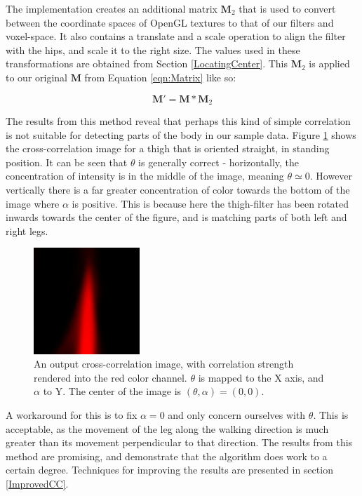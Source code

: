 The implementation creates an additional matrix $\mathbf{M}_2$ that is used to convert between the coordinate spaces of OpenGL textures to that of our filters and voxel-space.
It also contains a translate and a scale operation to align the filter with the hips, and scale it to the right size.
The values used in these transformations are obtained from Section \ref{LocatingCenter}.
This $\mathbf{M}_2$ is applied to our original $\mathbf{M}$ from Equation \ref{eqn:Matrix} like so:

\begin{equation}
	\mathbf{M}' = \mathbf{M} * \mathbf{M}_2
\end{equation}

\bigskip
\noindent The results from this method reveal that perhaps this kind of simple correlation is not suitable for detecting parts of the body in our sample data.
Figure \ref{ParameterSpace} shows the cross-correlation image for a thigh that is oriented straight, in standing position.
It can be seen that $\theta$ is generally correct - horizontally, the concentration of intensity is in the middle of the image, meaning $\theta \simeq 0$.
However vertically there is a far greater concentration of color towards the bottom of the image where $\alpha$ is positive.
This is because here the thigh-filter has been rotated inwards towards the center of the figure, and is matching parts of both left and right legs.

\begin{figure}[tb]
	\vspace{-10pt}
	\centering
	\includegraphics[height=4cm]{parameterspace.png}
	\caption{An output cross-correlation image, with correlation strength rendered into the red color channel.
		$\theta$ is mapped to the X axis, and $\alpha$ to Y.
		The center of the image is $(\theta, \alpha) = (0,0)$.}
	\label{ParameterSpace}
\end{figure}

A workaround for this is to fix $\alpha = 0$ and only concern ourselves with $\theta$.
This is acceptable, as the movement of the leg along the walking direction is much greater than its movement perpendicular to that direction.
The results from this method are promising, and demonstrate that the algorithm does work to a certain degree.
Techniques for improving the results are presented in section \ref{ImprovedCC}.


